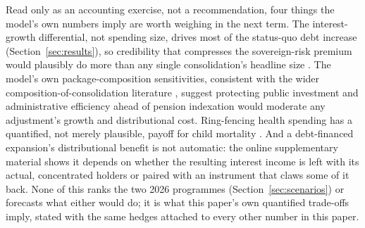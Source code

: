 \documentclass[11pt,a4paper]{article}
\begin{document}
Read only as an accounting exercise, not a recommendation, four things the model's own numbers imply are worth weighing in the next term. The interest-growth differential, not spending size, drives most of the status-quo debt increase (Section~\ref{sec:results}), so credibility that compresses the sovereign-risk premium would plausibly do more than any single consolidation's headline size \citep{blanchard2019,furmansummers2020}. The model's own package-composition sensitivities, consistent with the wider composition-of-consolidation literature \citep{alesinaardagna2010,pires2014}, suggest protecting public investment and administrative efficiency ahead of pension indexation would moderate any adjustment's growth and distributional cost. Ring-fencing health spending has a quantified, not merely plausible, payoff for child mortality \citep{szkloclarkerocha2024,rasellaetal2013}. And a debt-financed expansion's distributional benefit is not automatic: the online supplementary material shows it depends on whether the resulting interest income is left with its actual, concentrated holders \citep{lustig2018ceq,higginspereira2014} or paired with an instrument that claws some of it back. None of this ranks the two 2026 programmes (Section~\ref{sec:scenarios}) or forecasts what either would do; it is what this paper's own quantified trade-offs imply, stated with the same hedges attached to every other number in this paper.

\end{document}
